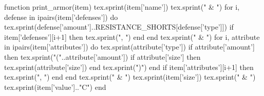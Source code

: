 \begin{luacode}
	function print_armor(item)
		tex.sprint(item['name'])
		tex.sprint(" & ")
		for i, defense in ipairs(item['defenses'])
		do
			tex.sprint(defense['amount']..RESISTANCE_SHORTS[defense['type']])
			if item['defenses'][i+1]
			then
				tex.sprint(", ")
			end
		end
		tex.sprint(" & ")
		for i, attribute in ipairs(item['attributes'])
		do
			tex.sprint(attribute['type'])
			if attribute['amount'] then
				tex.sprint("("..attribute['amount'])
				if attribute['size'] then
					tex.sprint(attribute['size'])
				end
				tex.sprint(")")
			end
			if item['attributes'][i+1]
			then
				tex.sprint(", ")
			end
		end
		tex.sprint(" & ")
		tex.sprint(item['size'])
		tex.sprint(" & ")
		tex.sprint(item['value'].."C")
	end


\end{luacode}
